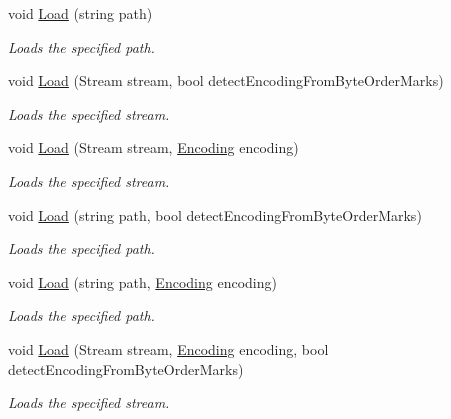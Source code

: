 \begin{DoxyCompactItemize}
void \hyperlink{class_html_agility_pack_1_1_html_document_a206d7e6b554ac1d08bfc83609db66716}{Load} (string path)
\begin{DoxyCompactList}\small\item\em Loads the specified path. \end{DoxyCompactList}\item 
void \hyperlink{class_html_agility_pack_1_1_html_document_a36fde208dfaee7e0cc75a3ea8ec48689}{Load} (Stream stream, bool detect\+Encoding\+From\+Byte\+Order\+Marks)
\begin{DoxyCompactList}\small\item\em Loads the specified stream. \end{DoxyCompactList}\item 
void \hyperlink{class_html_agility_pack_1_1_html_document_aea2fcb410174b92f6671d8a5a02ff07d}{Load} (Stream stream, \hyperlink{class_html_agility_pack_1_1_html_document_a220bdf28a5e35f4898075084be2d59f0}{Encoding} encoding)
\begin{DoxyCompactList}\small\item\em Loads the specified stream. \end{DoxyCompactList}\item 
void \hyperlink{class_html_agility_pack_1_1_html_document_a9eb27328fa78b622b0945e15cfd8b640}{Load} (string path, bool detect\+Encoding\+From\+Byte\+Order\+Marks)
\begin{DoxyCompactList}\small\item\em Loads the specified path. \end{DoxyCompactList}\item 
void \hyperlink{class_html_agility_pack_1_1_html_document_a9071a8a3f0ce5df5749e2aa8f6e17508}{Load} (string path, \hyperlink{class_html_agility_pack_1_1_html_document_a220bdf28a5e35f4898075084be2d59f0}{Encoding} encoding)
\begin{DoxyCompactList}\small\item\em Loads the specified path. \end{DoxyCompactList}\item 
void \hyperlink{class_html_agility_pack_1_1_html_document_ab9640d6c2f1756965237cee712b89461}{Load} (Stream stream, \hyperlink{class_html_agility_pack_1_1_html_document_a220bdf28a5e35f4898075084be2d59f0}{Encoding} encoding, bool detect\+Encoding\+From\+Byte\+Order\+Marks)
\begin{DoxyCompactList}\small\item\em Loads the specified stream. \end{DoxyCompactList}\item 

\end{DoxyCompactItemize}
